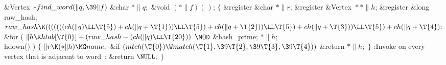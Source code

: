 \Y\B\1\1\&{Vertex} ${}{*}\\{find\_word}(\|q,\39\|f){}$\6
\&{char} ${}{*}\|q;{}$\6
\&{void} ${}({*}\|f)(\,){}$;\6
$\{{}$\5
\&{register} \&{char} ${}{*}\|r{}$;\6
\&{register} \&{Vertex} ${}{*}{*}\|h{}$;\6
\&{register} \&{long} \\{raw\_hash};\7
${}\\{raw\_hash}\K(((((((\\{ch}(\|q)\LL\T{5})+\\{ch}(\|q+\T{1}))\LL\T{5})+%
\\{ch}(\|q+\T{2}))\LL\T{5})+\\{ch}(\|q+\T{3}))\LL\T{5})+\\{ch}(\|q+\T{4});$ %
\&{for} ( $\|h\K\\{htab}[\T{0}]+(\\{raw\_hash}-(\\{ch}(\|q)\LL\T{20}))$ $\MOD$ %
\&{hash\_prime};\7
${}{*}\|h;$ \\{hdown}() ) \6
${}\{{}$\1\6
${}\|r\K({*}\|h)\MG\\{name};{}$\6
\&{if} ${}(\\{mtch}(\T{0})\W\\{match}(\T{1},\39\T{2},\39\T{3},\39\T{4})){}$\1\5
\&{return} ${}{*}\|h;{}$\2\6
\4${}\}{}$\2\6
:Invoke  on every vertex that is adjacent to word~\X;\6
\&{return} ${}\NULL;$ $\}{}$\par
\fi

